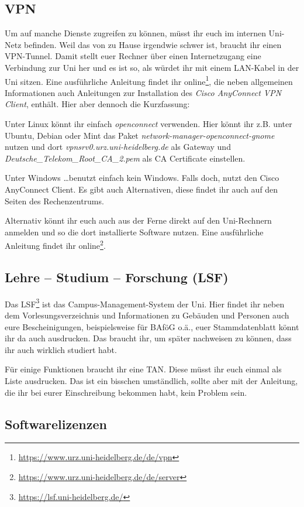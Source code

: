 \subsection{VPN}
Um auf manche Dienste zugreifen zu können, müsst ihr euch im internen Uni-Netz befinden. Weil das von zu Hause irgendwie schwer ist, braucht ihr einen VPN-Tunnel. Damit stellt euer Rechner über einen Internetzugang eine Verbindung zur Uni her und es ist so, als würdet ihr mit einem LAN-Kabel in der Uni sitzen. Eine ausführliche Anleitung findet ihr online\footnote{\url{https://www.urz.uni-heidelberg.de/de/vpn}}, die neben allgemeinen Informationen auch Anleitungen zur Installation des \emph{Cisco AnyConnect VPN Client}, enthält. Hier aber dennoch die Kurzfassung:

Unter Linux könnt ihr einfach \emph{openconnect} verwenden. Hier könnt ihr z.B. unter Ubuntu, Debian oder Mint das Paket \emph{network-manager-openconnect-gnome} nutzen und dort \emph{vpnsrv0.urz.uni-heidelberg.de} als Gateway und \emph{Deutsche\_Telekom\_Root\_CA\_2.pem} als CA Certificate einstellen.

Unter Windows \ldots benutzt einfach kein Windows. Falls doch, nutzt den Cisco AnyConnect Client. Es gibt auch Alternativen, diese findet ihr auch auf den Seiten des Rechenzentrums.

Alternativ könnt ihr euch auch aus der Ferne direkt auf den Uni-Rechnern anmelden und so die dort installierte Software nutzen. Eine ausführliche Anleitung findet ihr online\footnote{\url{https://www.urz.uni-heidelberg.de/de/server}}.

\subsection{Lehre -- Studium -- Forschung (LSF)}
Das LSF\footnote{\url{https://lsf.uni-heidelberg.de/}} ist das Campus-Management-System der Uni. Hier findet ihr neben dem Vorlesungsverzeichnis und Informationen zu Gebäuden und Personen auch eure Bescheinigungen, beispielsweise für BAföG o.ä., euer Stammdatenblatt könnt ihr da auch ausdrucken. Das braucht ihr, um später nachweisen zu können, dass ihr auch wirklich studiert habt.

Für einige Funktionen braucht ihr eine TAN. Diese müsst ihr euch einmal als Liste ausdrucken. Das ist ein bisschen umständlich, sollte aber mit der Anleitung, die ihr bei eurer Einschreibung bekommen habt, kein Problem sein.

\subsection{Softwarelizenzen}

